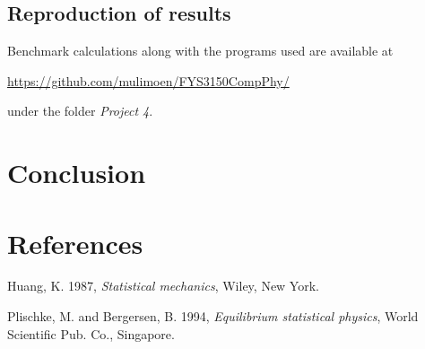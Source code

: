 \documentclass[11pt,a4paper,english]{article}
\numberwithin{equation}{section}
\begin{document}
\subsection{Reproduction of results}

Benchmark calculations along with the programs used are available at

\url{https://github.com/mulimoen/FYS3150CompPhy/}

under the folder \emph{Project 4}.

\section{Conclusion}

\section{References}
Huang, K. 1987, \emph{Statistical mechanics}, Wiley, New York. 

Plischke, M. and Bergersen, B. 1994, \emph{Equilibrium statistical physics}, World Scientific Pub. Co., Singapore.
\end{document}
